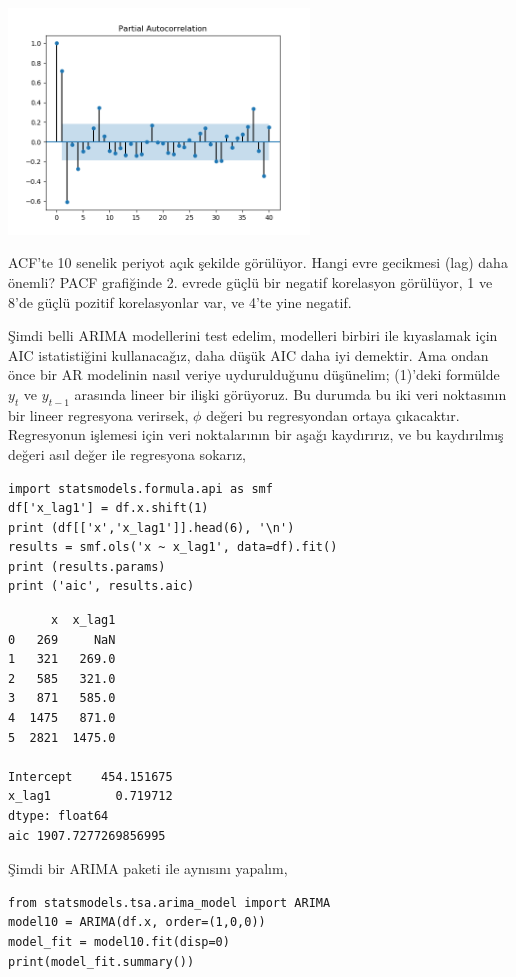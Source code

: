 \documentclass[12pt,fleqn]{article}\usepackage{../../common}
\begin{document}
\includegraphics[height=6cm]{tser_ar_03.png}

ACF'te 10 senelik periyot açık şekilde görülüyor. Hangi evre gecikmesi
(lag) daha önemli? PACF grafiğinde 2. evrede güçlü bir negatif korelasyon
görülüyor, 1 ve 8'de güçlü pozitif korelasyonlar var, ve 4'te yine
negatif. 

Şimdi belli ARIMA modellerini test edelim, modelleri birbiri ile kıyaslamak
için AIC istatistiğini kullanacağız, daha düşük AIC daha iyi demektir. Ama
ondan önce bir AR modelinin nasıl veriye uydurulduğunu düşünelim; (1)'deki
formülde $y_t$ ve $y_{t-1}$ arasında lineer bir ilişki görüyoruz. Bu
durumda bu iki veri noktasının bir lineer regresyona verirsek, $\phi$
değeri bu regresyondan ortaya çıkacaktır. Regresyonun işlemesi için veri
noktalarının bir aşağı kaydırırız, ve bu kaydırılmış değeri asıl değer ile
regresyona sokarız,

\begin{verbatim}
import statsmodels.formula.api as smf
df['x_lag1'] = df.x.shift(1)
print (df[['x','x_lag1']].head(6), '\n')
results = smf.ols('x ~ x_lag1', data=df).fit()
print (results.params)
print ('aic', results.aic)
\end{verbatim}

\begin{verbatim}
      x  x_lag1
0   269     NaN
1   321   269.0
2   585   321.0
3   871   585.0
4  1475   871.0
5  2821  1475.0 

Intercept    454.151675
x_lag1         0.719712
dtype: float64
aic 1907.7277269856995
\end{verbatim}

Şimdi bir ARIMA paketi ile aynısını yapalım,

\begin{verbatim}
from statsmodels.tsa.arima_model import ARIMA
model10 = ARIMA(df.x, order=(1,0,0))
model_fit = model10.fit(disp=0)
print(model_fit.summary())
\end{verbatim}
\end{document}
